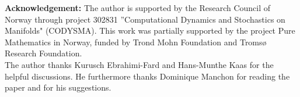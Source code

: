 \documentclass[10pt,a4paper]{article}
\begin{document}
\vspace{1cm}

{\bf{Acknowledgement:}}
The author is supported by the Research Council of Norway through project 302831 ''Computational Dynamics and Stochastics on Manifolds" (CODYSMA). This work was partially supported by the project Pure Mathematics in Norway, funded by Trond Mohn Foundation and Troms{\o} Research Foundation. \\
The author thanks Kurusch Ebrahimi-Fard and Hans-Munthe Kaas for the helpful discussions. He furthermore thanks Dominique Manchon for reading the paper and for his suggestions.



\end{document}

